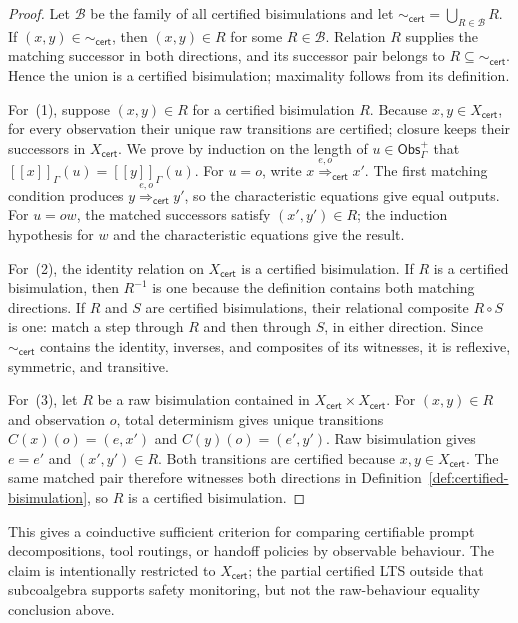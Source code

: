 \documentclass[a4paper,fleqn]{cas-sc}
\newcommand{\sem}[1]{\left[\!\left[#1\right]\!\right]}
\newcommand{\Obs}{\mathsf{Obs}}
\newcommand{\cert}{\mathsf{cert}}
\begin{document}
\begin{proof}
Let \(\mathcal{B}\) be the family of all certified bisimulations and let
\(\sim_{\cert}=\bigcup_{R\in\mathcal{B}}R\). If
\((x,y)\in\sim_{\cert}\), then \((x,y)\in R\) for some
\(R\in\mathcal{B}\). Relation \(R\) supplies the matching successor in
both directions, and its successor pair belongs to
\(R\subseteq\sim_{\cert}\). Hence the union is a certified bisimulation;
maximality follows from its definition.

For~(1), suppose \((x,y)\in R\) for a certified bisimulation \(R\).
Because \(x,y\in X_{\cert}\), for every observation their unique raw
transitions are certified; closure keeps their successors in
\(X_{\cert}\). We prove by induction on the length of
\(u\in\Obs_{\Gamma}^{+}\) that
\(\sem{x}_{\Gamma}(u)=\sem{y}_{\Gamma}(u)\). For \(u=o\), write
\(x\overset{e,o}{\Longrightarrow}_{\cert}x'\). The first matching
condition produces \(y\overset{e,o}{\Longrightarrow}_{\cert}y'\), so the
characteristic equations give equal outputs. For \(u=ow\), the matched
successors satisfy \((x',y')\in R\); the induction hypothesis for \(w\)
and the characteristic equations give the result.

For~(2), the identity relation on \(X_{\cert}\) is a certified
bisimulation. If \(R\) is a certified bisimulation, then \(R^{-1}\) is one
because the definition contains both matching directions. If \(R\) and
\(S\) are certified bisimulations, their relational composite \(R\circ S\)
is one: match a step through \(R\) and then through \(S\), in either
direction. Since \(\sim_{\cert}\) contains the identity, inverses, and
composites of its witnesses, it is reflexive, symmetric, and transitive.

For~(3), let \(R\) be a raw bisimulation contained in
\(X_{\cert}\times X_{\cert}\). For \((x,y)\in R\) and observation \(o\),
total determinism gives unique transitions \(C(x)(o)=(e,x')\) and
\(C(y)(o)=(e',y')\). Raw bisimulation gives \(e=e'\) and
\((x',y')\in R\). Both transitions are certified because \(x,y\in
X_{\cert}\). The same matched pair therefore witnesses both directions in
Definition~\ref{def:certified-bisimulation}, so \(R\) is a certified
bisimulation.
\end{proof}

This gives a coinductive sufficient criterion for comparing certifiable prompt
decompositions, tool routings, or handoff policies by observable behaviour. The
claim is intentionally restricted to \(X_{\cert}\); the partial certified LTS
outside that subcoalgebra supports safety monitoring, but not the raw-behaviour
equality conclusion above.
\end{document}
